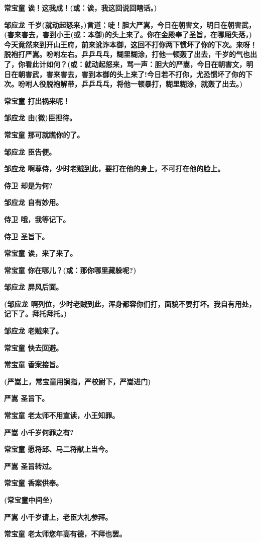 \textbf{常宝童 诶！这我成！(或：诶，我这回说回瞎话。)}

\textbf{邹应龙
千岁(就动起怒来，)言道：唗！胆大严嵩，今日在朝害文，明日在朝害武，(害来害去，害到小王(或：本御)的头上来了。你在金殿奉了圣旨，在哪厢失落，)今天竟然来到开山王府，前来讹诈本御，这回不打你两下惯坏了你的下次。来呀！脱袍打严嵩。吩咐左右。乒乒乓乓，糊里糊涂，打他一顿轰了出去，千岁的气也出了，你看此计如何？(或：就动起怒来，骂一声：胆大的严嵩，今日在朝害文，明日在朝害武，害来害去，害到本御的头上来了!今日若不打你，尤恐惯坏了你的下次。吩咐人役脱袍解带，乒乒乓乓，将他一顿暴打，糊里糊涂，就轰了出去。)}

\textbf{常宝童 打出祸来呢！}

\textbf{邹应龙 由(微)臣担待。}

\textbf{常宝童 那可就瞧你的了。}

\textbf{邹应龙 臣告便。}

\textbf{邹应龙 啊尊侍，少时老贼到此，要打在他的身上，不可打在他的脸上。}

\textbf{侍卫 却是为何?}

\textbf{邹应龙 自有妙用。}

\textbf{侍卫 哦，我等记下。}

\textbf{侍卫 圣旨下。}

\textbf{常宝童 诶，来了来了。}

\textbf{常宝童 你在哪儿？(或：那你哪里藏躲呢?)}

\textbf{邹应龙 屏风后面。}

\textbf{(邹应龙
啊列位，少时老贼到此，浑身都容你们打，面貌不要打坏。我自有用处，记下了。拜托拜托。)}

\textbf{邹应龙 老贼来了。}

\textbf{常宝童 快去回避。}

\textbf{常宝童 香案接旨。}

\textbf{(严嵩上，常宝童用锏指，严校尉下，严嵩进门)}

\textbf{严嵩 圣旨下。}

\textbf{常宝童 老太师不用宣读，小王知罪。}

\textbf{严嵩 小千岁何罪之有?}

\textbf{常宝童 愿将邱、马二将献上当今。}

\textbf{严嵩 圣旨转过。}

\textbf{常宝童 香案供奉。}

\textbf{(常宝童中间坐)}

\textbf{严嵩 小千岁请上，老臣大礼参拜。}

\textbf{常宝童 老太师您年高有德，不拜也罢。}

